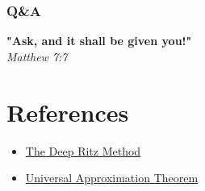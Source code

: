 \documentclass{beamer}
\begin{document}
\begin{frame}
  \frametitle{Q\&A}
\textbf{"Ask, and it shall be given you!"}\centering\\
\em Matthew 7:7
\end{frame}
\section{References}
\begin{frame}
	\begin{itemize}
		\item \href{https://arxiv.org/pdf/1710.00211.pdf}{The Deep Ritz Method}
		\item \href{https://en.wikipedia.org/wiki/Universal_approximation_theorem}{Universal Approximation Theorem}
	\end{itemize}
\end{frame}
\end{document}
